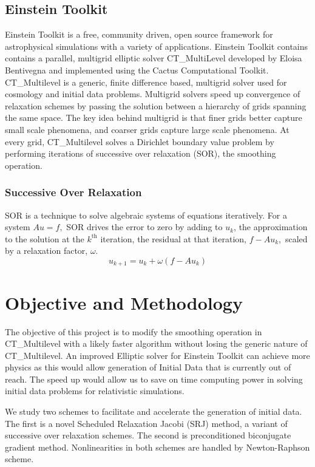 \documentclass[12pt]{article}
\begin{document}
\begin{multicols}{2}
\subsection{Einstein Toolkit}
Einstein Toolkit is a free, community driven, open source framework for astrophysical simulations with a variety of applications. Einstein Toolkit contains contains a parallel, multigrid elliptic solver CT\_MultiLevel developed by Eloisa Bentivegna and implemented using the Cactus Computational Toolkit. CT\_Multilevel is a generic, finite difference based, multigrid solver used for cosmology and initial data problems. Multigrid solvers speed up convergence of relaxation schemes by passing the solution between a hierarchy of grids spanning the same space. The key idea behind multigrid is that finer grids better capture small scale phenomena, and coarser grids capture large scale phenomena. At every grid, CT\_Multilevel solves a Dirichlet boundary value problem by performing iterations of successive over relaxation (SOR), the smoothing operation.

\subsubsection{Successive Over Relaxation}
SOR is a technique to solve algebraic systems of equations iteratively. For a system $Au=f,$ SOR drives the error to zero by adding to $u_k$, the approximation to the solution at the $k^\text{th}$ iteration, the residual at that iteration, $f-Au_k,$ scaled by a relaxation factor, $\omega$.
\begin{equation}
    u_{k+1} = u_{k} + \omega (f-Au_k)
\end{equation}

\section{Objective and Methodology}
The objective of this project is to modify the smoothing operation in CT\_Multilevel with a likely faster algorithm without losing the generic nature of CT\_Multilevel. An improved Elliptic solver for Einstein Toolkit can achieve more physics as this would allow generation of Initial Data that is currently out of reach. The speed up would allow us to save on time computing power in solving initial data problems for relativistic simulations.

We study two schemes to facilitate and accelerate the generation of initial data. The first is a novel Scheduled Relaxation Jacobi (SRJ) method, a variant of successive over relaxation schemes. The second is preconditioned biconjugate gradient method. Nonlinearities in both schemes are handled by Newton-Raphson scheme.


\end{multicols}
\end{document}

